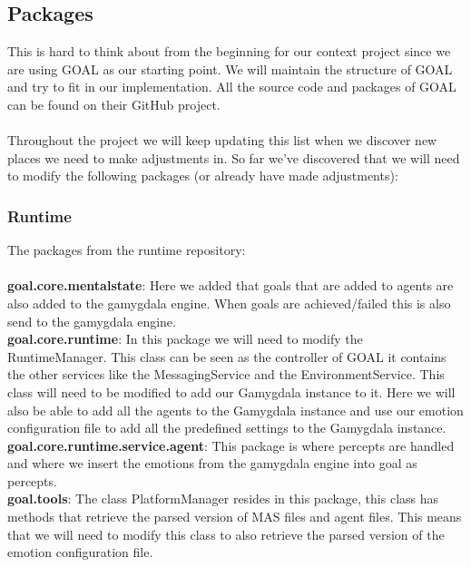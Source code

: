 \documentclass[]{article}
\begin{document}
\subsection{Packages}
This is hard to think about from the beginning for our context project since we are using GOAL as our starting point. We will maintain the structure of GOAL and try to fit in our implementation. All the source code and \gls{packages} of GOAL can be found on their GitHub project.
\\
\\
Throughout the project we will keep updating this list when we discover new places we need to make adjustments in. So far we've discovered that we will need to modify the following packages (or already have made adjustments):

\subsubsection{Runtime}
The packages from the runtime repository: \\ \\
\textbf{goal.core.mentalstate}: Here we added that goals that are added to agents are also added to the gamygdala engine. When goals are achieved/failed this is also send to the gamygdala engine. \\
\textbf{goal.core.runtime}: In this package we will need to modify the RuntimeManager. This class can be seen as the controller of GOAL it contains the other services like the MessagingService and the EnvironmentService. This class will need to be modified to add our Gamygdala instance to it. Here we will also be able to add all the agents to the Gamygdala instance and use our emotion configuration file to add all the predefined settings to the Gamygdala instance. \\
\textbf{goal.core.runtime.service.agent}: This package is where percepts are handled and where we insert the emotions from the gamygdala engine into goal as percepts. \\
\textbf{goal.tools}: The class PlatformManager resides in this package, this class has methods that retrieve the parsed version of MAS files and agent files. This means that we will need to modify this class to also retrieve the parsed version of the emotion configuration file.
\end{document}
